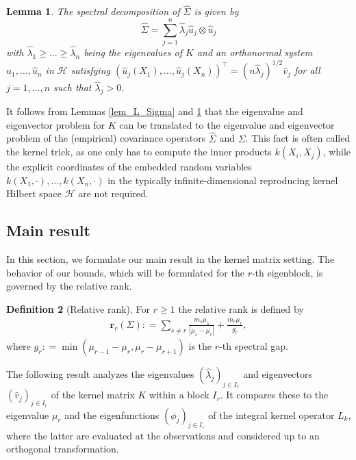 \documentclass[a4paper,11pt]{article} %
\numberwithin{equation}{section}
\theoremstyle{definition}
\newtheorem{definition}{Definition}[section]
\theoremstyle{remark}
\theoremstyle{plain}
\newtheorem{lemma}[definition]{Lemma}
\begin{document}
\begin{lemma}
\label{lem_L_Sigma_empirical}
  The spectral decomposition of $ \widehat{\Sigma} $ is given by
  \[
    \widehat\Sigma=\sum_{j=1}^n\widehat\lambda_j \widehat u_j\otimes \widehat u_j
  \]
  with $ \widehat \lambda_1 \ge \dots \ge \widehat \lambda_n $ being the eigenvalues of $K$ and an orthonormal system $ \widehat u_1, \dots, \widehat u_n $ in $ \mathcal{H} $ satisfying $(\widehat u_j(X_1), \dots, \widehat u_j(X_n))^\top = (n \widehat{\lambda}_j)^{1/2} \widehat v_j $ for all $ j = 1, \dots, n $ such that $ \widehat \lambda_j >0 $.
\end{lemma}

It follows from Lemmas \ref{lem_L_Sigma} and \ref{lem_L_Sigma_empirical} that the eigenvalue and eigenvector problem for $K$ can be translated to the eigenvalue and eigenvector problem of the (empirical) covariance operators $\widehat\Sigma$ and  $\Sigma$.  This fact is often called the kernel trick, as one only has to compute the inner products $k(X_i,X_j)$, while the explicit coordinates of the embedded random variables \( k(X_1, \cdot), \dots, k(X_n, \cdot) \) in the typically infinite-dimensional reproducing kernel Hilbert space $\mathcal{H}$ are not required.



\subsection{Main result}%
\label{ssec_MainResults}

In this section, we formulate our main result in the kernel matrix setting. The behavior of our bounds, which will be formulated for the \( r \)-th eigenblock, is governed by the relative rank.

\begin{definition}[Relative rank]
    For $r\geq 1 $ the relative rank is defined by
    \begin{align}
  \mathbf{r}_{r}(\Sigma): = \sum_{s \ne r} \frac{m_{s} \mu_{s}}{| \mu_{s} - \mu_{r} |} 
                          + \frac{m_{r} \mu_{r}}{g_{r}},
\end{align}
where \( g_{r}: = \min(\mu_{r - 1} - \mu_{r}, \mu_{r} - \mu_{r + 1}) \) is the \( r \)-th spectral gap.
\end{definition}



The following result analyzes the eigenvalues $(\widehat{\lambda}_j)_{j\in I_r}$ and eigenvectors $(\widehat v_j)_{j \in I_r}$ of the kernel matrix $K$ within a block $I_r$. It compares these to the eigenvalue $\mu_r$ and the eigenfunctions $(\phi_j)_{j\in I_r}$ of the integral kernel operator $L_k$, where the latter are evaluated at the observations and considered up to an orthogonal transformation.
\end{document}
